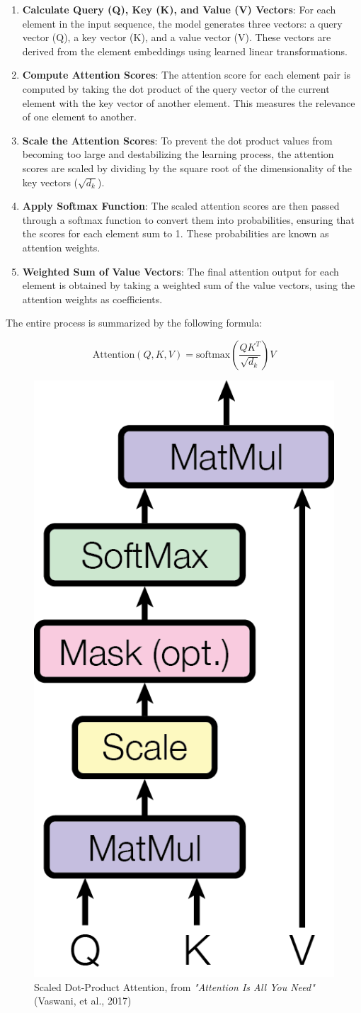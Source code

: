 \begin{enumerate}
    \item \textbf{Calculate Query (Q), Key (K), and Value (V) Vectors}: For each element in the input sequence, the model generates three vectors: a query vector (Q), a key vector (K), and a value vector (V). These vectors are derived from the element embeddings using learned linear transformations.
    \item \textbf{Compute Attention Scores}: The attention score for each element pair is computed by taking the dot product of the query vector of the current element with the key vector of another element. This measures the relevance of one element to another.
    \item \textbf{Scale the Attention Scores}: To prevent the dot product values from becoming too large and destabilizing the learning process, the attention scores are scaled by dividing by the square root of the dimensionality of the key vectors ($\sqrt{d_k}$).
    \item \textbf{Apply Softmax Function}: The scaled attention scores are then passed through a softmax function to convert them into probabilities, ensuring that the scores for each element sum to 1. These probabilities are known as attention weights.
    \item \textbf{Weighted Sum of Value Vectors}: The final attention output for each element is obtained by taking a weighted sum of the value vectors, using the attention weights as coefficients.
\end{enumerate}

The entire process is summarized by the following formula:

\[
\text{Attention}(Q, K, V) = \text{softmax}\left(\frac{QK^T}{\sqrt{d_k}}\right)V
\]

\begin{figure}[htbp]
    \centering
    \includegraphics[width=3 cm]{3_ChapterTranformerVariants/figuras/ScaledDotProductAttention.png}
    \caption{Scaled Dot-Product Attention, from \textit{"Attention Is All You Need"} (Vaswani, et al., 2017) \cite{vaswani2023attention}}
    \end{figure}

